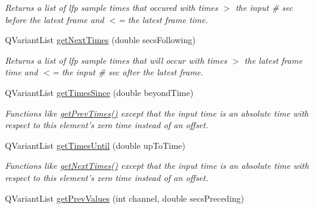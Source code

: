 \begin{DoxyCompactItemize}
\begin{DoxyCompactList}\small\item\em Returns a list of lfp sample times that occured with times $>$ the input \# sec before the latest frame and $<$= the latest frame time. \end{DoxyCompactList}\item 
Q\-Variant\-List \hyperlink{class_picto_1_1_analysis_lfp_data_a9156212e5d358e62a11c7cf0704d9eab}{get\-Next\-Times} (double secs\-Following)
\begin{DoxyCompactList}\small\item\em Returns a list of lfp sample times that will occur with times $>$ the latest frame time and $<$= the input \# sec after the latest frame. \end{DoxyCompactList}\item 
\hypertarget{class_picto_1_1_analysis_lfp_data_a47baf0ef3ea71ebfd18a079ecb9acf78}{Q\-Variant\-List \hyperlink{class_picto_1_1_analysis_lfp_data_a47baf0ef3ea71ebfd18a079ecb9acf78}{get\-Times\-Since} (double beyond\-Time)}\label{class_picto_1_1_analysis_lfp_data_a47baf0ef3ea71ebfd18a079ecb9acf78}

\begin{DoxyCompactList}\small\item\em Functions like \hyperlink{class_picto_1_1_analysis_lfp_data_acc674aa0cc3c61731a500372294b6f8b}{get\-Prev\-Times()} except that the input time is an absolute time with respect to this element's zero time instead of an offset. \end{DoxyCompactList}\item 
\hypertarget{class_picto_1_1_analysis_lfp_data_a27c5ff94c293c0f9accc2f2db6b3a70b}{Q\-Variant\-List \hyperlink{class_picto_1_1_analysis_lfp_data_a27c5ff94c293c0f9accc2f2db6b3a70b}{get\-Times\-Until} (double up\-To\-Time)}\label{class_picto_1_1_analysis_lfp_data_a27c5ff94c293c0f9accc2f2db6b3a70b}

\begin{DoxyCompactList}\small\item\em Functions like \hyperlink{class_picto_1_1_analysis_lfp_data_a9156212e5d358e62a11c7cf0704d9eab}{get\-Next\-Times()} except that the input time is an absolute time with respect to this element's zero time instead of an offset. \end{DoxyCompactList}\item 
\hypertarget{class_picto_1_1_analysis_lfp_data_abc3fdc4e54b48f6254793ec88c696665}{Q\-Variant\-List \hyperlink{class_picto_1_1_analysis_lfp_data_abc3fdc4e54b48f6254793ec88c696665}{get\-Prev\-Values} (int channel, double secs\-Preceding)}\label{class_picto_1_1_analysis_lfp_data_abc3fdc4e54b48f6254793ec88c696665}


\end{DoxyCompactItemize}
